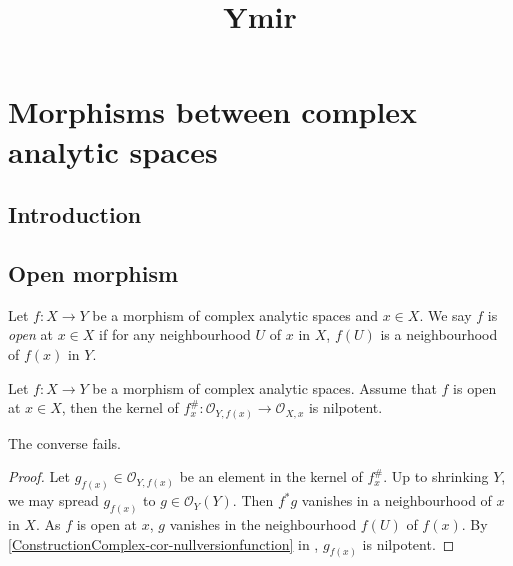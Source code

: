 



\title{Ymir}










\maketitle


\tableofcontents

\chapter*{Morphisms between complex analytic spaces}\label{chap-morphismscomplex}


\section{Introduction}\label{sec-introduction-morphismscomplex}

\section{Open morphism}
\begin{definition}
    Let $f:X\rightarrow Y$ be a morphism of complex analytic spaces and $x\in X$. We say $f$ is \emph{open} at $x\in X$ if for any neighbourhood $U$ of $x$ in $X$, $f(U)$ is a neighbourhood of $f(x)$ in $Y$.
\end{definition}

\begin{proposition}\label{prop-openmapkernelnil}
    Let $f:X\rightarrow Y$ be a morphism of complex analytic spaces. Assume that $f$ is open at $x\in X$, then the kernel of $f_x^{\#}:\mathcal{O}_{Y,f(x)}\rightarrow \mathcal{O}_{X,x}$ is nilpotent.
\end{proposition}
The converse fails.
\begin{proof}
    Let $g_{f(x)}\in \mathcal{O}_{Y,f(x)}$ be an element in the kernel of $f_x^{\#}$. Up to shrinking $Y$, we may spread $g_{f(x)}$ to $g\in \mathcal{O}_Y(Y)$. Then $f^*g$ vanishes in a neighbourhood of $x$ in $X$. As $f$ is open at $x$, $g$ vanishes in the neighbourhood $f(U)$ of $f(x)$. By \cref{ConstructionComplex-cor-nullversionfunction} in , $g_{f(x)}$ is nilpotent.
\end{proof}



